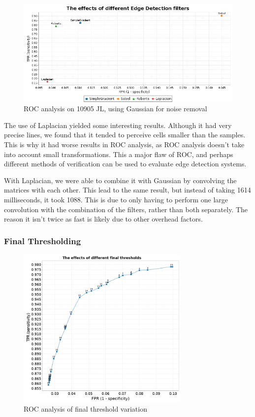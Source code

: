 \documentclass[10pt,a4paper]{article}
\begin{document}
\begin{figure}[h]
\centering
\includegraphics[scale=0.5]{graphs/1-edge_detect_all.png}
\caption{ROC analysis on 10905 JL, using Gaussian for noise removal}
\label{fig:edgedetectors}
\end{figure}

The use of Laplacian yielded some interesting results. Although it had very precise lines, we found that it tended to perceive cells smaller than the samples. This is why it had worse results in ROC analysis, as ROC analysis doesn’t take into account small transformations. This a major flaw of ROC, and perhaps different methods of verification can be used to evaluate edge detection systems.

With Laplacian, we were able to combine it with Gaussian by convolving the matrices with each other. This lead to the same result, but instead of taking 1614 milliseconds, it took 1088. This is due to only having to perform one large convolution with the combination of the filters, rather than both separately. The reason it isn’t twice as fast is likely due to other overhead factors.
\subsubsection*{Final Thresholding}

\begin{figure}[h]
\centering
\includegraphics[width=0.75\textwidth]{graphs/threshold_example}
\caption{ROC analysis of final threshold variation}
\label{fig:finalthreshold}
\end{figure}
\end{document}
